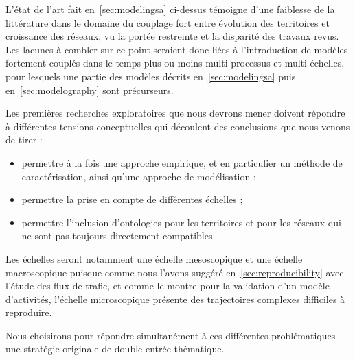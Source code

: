 L'état de l'art fait en~\ref{sec:modelingsa} ci-dessus témoigne d'une faiblesse de la littérature dans le domaine du couplage fort entre évolution des territoires et croissance des réseaux, vu la portée restreinte et la disparité des travaux revus. Les lacunes à combler sur ce point seraient donc liées à l'introduction de modèles fortement couplés dans le temps plus ou moins multi-processus et multi-échelles, pour lesquels une partie des modèles décrits en~\ref{sec:modelingsa} puis en~\ref{sec:modelography} sont précurseurs.


Les premières recherches exploratoires que nous devrons mener doivent répondre à différentes tensions conceptuelles qui découlent des conclusions que nous venons de tirer :
\begin{itemize}
	\item permettre à la fois une approche empirique, et en particulier un méthode de caractérisation, ainsi qu'une approche de modélisation ;
	\item permettre la prise en compte de différentes échelles ;
	\item permettre l'inclusion d'ontologies pour les territoires et pour les réseaux qui ne sont pas toujours directement compatibles.
\end{itemize}

Les échelles seront notamment une échelle mesoscopique et une échelle macroscopique puisque comme nous l'avons suggéré en~\ref{sec:reproducibility} avec l'étude des flux de trafic, et comme le montre \cite{yasmin2017macro} pour la validation d'un modèle d'activités, l'échelle microscopique présente des trajectoires complexes difficiles à reproduire.


Nous choisirons pour répondre simultanément à ces différentes problématiques une stratégie originale de double entrée thématique.





